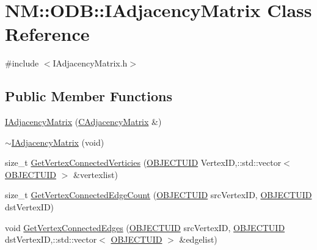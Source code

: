 \hypertarget{class_n_m_1_1_o_d_b_1_1_i_adjacency_matrix}{}\section{N\+M\+:\+:O\+D\+B\+:\+:I\+Adjacency\+Matrix Class Reference}
\label{class_n_m_1_1_o_d_b_1_1_i_adjacency_matrix}


{\ttfamily \#include $<$I\+Adjacency\+Matrix.\+h$>$}

\subsection*{Public Member Functions}
\begin{DoxyCompactItemize}
\item 
\hyperlink{class_n_m_1_1_o_d_b_1_1_i_adjacency_matrix_a20dd44c7c026495fdaff982d1f5354dc}{I\+Adjacency\+Matrix} (\hyperlink{class_n_m_1_1_o_d_b_1_1_c_adjacency_matrix}{C\+Adjacency\+Matrix} \&)
\item 
\hyperlink{class_n_m_1_1_o_d_b_1_1_i_adjacency_matrix_aeff83ec45b1c5248c098652ff22409c3}{$\sim$\+I\+Adjacency\+Matrix} (void)
\item 
size\+\_\+t \hyperlink{class_n_m_1_1_o_d_b_1_1_i_adjacency_matrix_ae4b44c634f94a2a830f16dbda00abad4}{Get\+Vertex\+Connected\+Verticies} (\hyperlink{namespace_n_m_1_1_o_d_b_a262b64fab56baaa96e18bac4ada88265}{O\+B\+J\+E\+C\+T\+U\+I\+D} Vertex\+I\+D,\+::std\+::vector$<$ \hyperlink{namespace_n_m_1_1_o_d_b_a262b64fab56baaa96e18bac4ada88265}{O\+B\+J\+E\+C\+T\+U\+I\+D} $>$ \&vertexlist)
\item 
size\+\_\+t \hyperlink{class_n_m_1_1_o_d_b_1_1_i_adjacency_matrix_a416993e801c8e8d35fbbcb53f3e0f59e}{Get\+Vertex\+Connected\+Edge\+Count} (\hyperlink{namespace_n_m_1_1_o_d_b_a262b64fab56baaa96e18bac4ada88265}{O\+B\+J\+E\+C\+T\+U\+I\+D} src\+Vertex\+I\+D, \hyperlink{namespace_n_m_1_1_o_d_b_a262b64fab56baaa96e18bac4ada88265}{O\+B\+J\+E\+C\+T\+U\+I\+D} dst\+Vertex\+I\+D)
\item 
void \hyperlink{class_n_m_1_1_o_d_b_1_1_i_adjacency_matrix_ac382e1ad751ff028f9e4f9ad878c2710}{Get\+Vertex\+Connected\+Edges} (\hyperlink{namespace_n_m_1_1_o_d_b_a262b64fab56baaa96e18bac4ada88265}{O\+B\+J\+E\+C\+T\+U\+I\+D} src\+Vertex\+I\+D, \hyperlink{namespace_n_m_1_1_o_d_b_a262b64fab56baaa96e18bac4ada88265}{O\+B\+J\+E\+C\+T\+U\+I\+D} dst\+Vertex\+I\+D,\+::std\+::vector$<$ \hyperlink{namespace_n_m_1_1_o_d_b_a262b64fab56baaa96e18bac4ada88265}{O\+B\+J\+E\+C\+T\+U\+I\+D} $>$ \&edgelist)

\end{DoxyCompactItemize}
